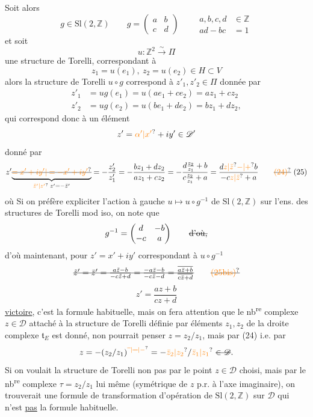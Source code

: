 Soit alors
\[
 g\in\mathrm{Sl}(2,\mathbb Z)\qquad
 g=\begin{pmatrix}a&b\\c&d\end{pmatrix}\qquad
 \begin{aligned}a,b,c,d&\in\mathbb Z\\ad-bc&=1\end{aligned}
\]
et soit 
\[
 u\colon\mathbb Z^2\xrightarrow{\sim}\Pi
\]
une structure de Torelli, correspondant à
\[
 z_1=u(e_1),\ z_2=u(e_2)\in H\subset V
\]
alors la structure de Torelli $u\circ g$ correspond à $z'_1,z'_2\in\Pi$ donnée par
\[
 \begin{aligned}
 z'_1&=ug(e_1)=u(ae_1+ce_2)=az_1+cz_2\\
 z'_2&=ug(e_2)=u(be_1+de_2)=bz_1+dz_2,
 \end{aligned}
\]
qui correspond donc à un élément
\[
 z'=\unsure{\alpha'|x'}+iy'\in\mathscr D'
\]
donné par
\[
 z'\deleted{\underbrace{\unsure{=x'+iy'|=-x'+iy'}}_{\unsure{\tilde z'|z'}\; z'=-\bar z'}}
 =-\frac{z'_2}{z'_1}=-\frac{bz_1+dz_2}{az_1+cz_2}
 =-\frac{d\frac{z_2}{z_1}+b}{c\frac{z_2}{z_1}+a}
 =\frac{d\unsure{z|\bar z}\unsure{-|+}b}{-c\unsure{z|\bar z}+a}
 \tag*{\deleted{\unsure{(24)}} (25)}
\]
où  Si on  préfère expliciter l'action à gauche $u\longmapsto u\circ g^{-1}$ de $\mathrm{Sl}(2,\mathbb Z)$ sur l'ens. des structures de Torelli mod iso, on note que
\[
 g^{-1}=\begin{pmatrix}d&-b\\-c&a\end{pmatrix}\qquad \text{\deleted{d'où,}}
\]
d'où maintenant, pour $z'=x'+iy'$ correspondant à $u\circ g^{-1}$
\[
 \deleted{\tilde z'=\bar z'=\frac{a\tilde z-b}{-c\tilde z+d}
 =\frac{-a\bar z-b}{-c\bar z-d}
 =\frac{\overline{a\bar z+b}}{\overline{c\bar z+d}}} \tag*{\deleted{\unsure{(25bis)}}}
\]
\[
 z'=\frac{az+b}{cz+d} \tag*{(25bis)}
\]
\uline{victoire}, c'est la formule habituelle, mais on fera attention que le nb\textsuperscript{re} complexe $z\in\mathscr D$ attaché à la structure de Torelli définie par  éléments $z_1,z_2$ de la droite complexe  $\mathfrak t_E$ est donné, non
  pourrait penser $z=z_2/z_1$,  mais par (24) i.e. par
\[
 z=-(z_2/z_1)^{\unsure{\overline{\phantom z}|\deleted{-}|-}}=-\unsure{\bar z_2|z_2}/\unsure{\bar z_1|z_1}\ \deleted{\in\mathscr D}.
\]
Si  on voulait  la structure de Torelli non pas par le point $z\in\mathscr D$ choisi, mais par le nb\textsuperscript{re} complexe $\tau=z_2/z_1$ lui même (symétrique de $z$ p.r. à l'axe imaginaire), on trouverait une formule de transformation d'opération de $\mathrm{Sl}(2,\mathbb Z)$ sur $\mathscr D$ qui n'est \uline{pas} la formule habituelle.

